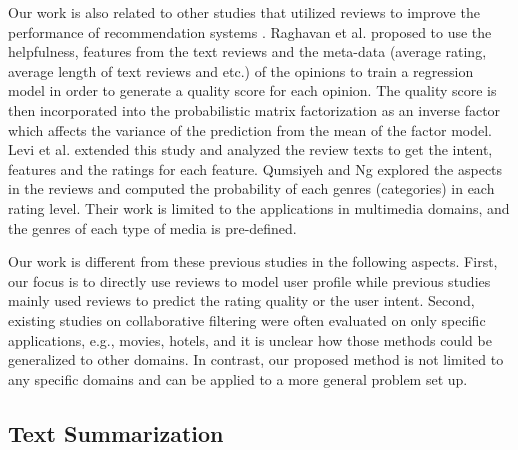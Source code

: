 Our work is also related to other studies that utilized reviews to improve 
the performance of recommendation systems 
\cite{Qumsiyeh:2012:PRM:2348283.2348349, SanPedro:2012:LUC:2187836.2187896, 
Raghavan:2012:RQA:2365952.2365978,hariricontext,Levi:2012:FNH:2365952.2365977}.
Raghavan et al. \cite{Raghavan:2012:RQA:2365952.2365978} proposed to 
use the helpfulness, features from the text reviews and 
the meta-data (average rating, average length of text reviews and etc.) 
of the opinions to train a regression model in order to generate a 
quality score for each opinion. The quality score is then 
incorporated into the probabilistic matrix factorization as an 
inverse factor which affects the variance of the prediction from the 
mean of the factor model.
Levi et al. \cite{Levi:2012:FNH:2365952.2365977} extended 
this study and analyzed the review texts to get the intent, 
features and the ratings for each feature. 
Qumsiyeh and Ng \cite{Qumsiyeh:2012:PRM:2348283.2348349} explored the 
aspects in the reviews and computed the probability of each genres 
(categories) in each rating level. Their work is limited to the 
applications in multimedia domains, and the genres of each type of 
media is pre-defined. 

Our work is different from these previous studies in the following 
aspects. First, our focus is to directly use reviews to model user 
profile while previous studies mainly used reviews to predict the 
rating quality or the user intent. Second, existing studies on 
collaborative filtering were often evaluated on only specific applications, 
e.g., movies, hotels, and it is unclear how those methods could 
be generalized to other domains. In contrast, our proposed method 
is not limited to any specific domains and can be applied to 
a more general problem set up.

\subsection{Text Summarization} 

